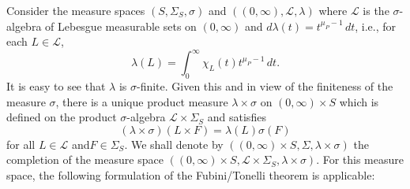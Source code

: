 \documentclass[11pt]{article}
\theoremstyle{theorem}
\begin{document}
 Consider the measure spaces $(S,\Sigma_S,\sigma)$ and $((0,\infty),\mathcal{L},\lambda)$ where $\mathcal{L}$ is the $\sigma$-algebra of Lebesgue measurable sets on $(0,\infty)$ and $d\lambda(t)=t^{\mu_P-1}\,dt$, i.e., for each $L\in\mathcal{L}$,
\begin{equation*}
\lambda(L)=\int_0^\infty \chi_{L}(t)t^{\mu_P-1}\,dt.
\end{equation*}
It is easy to see that $\lambda$ is $\sigma$-finite. Given this and in view of the finiteness of the measure $\sigma$, there is a unique product measure $\lambda\times\sigma$ on $(0,\infty)\times S$ which is defined on the product $\sigma$-algebra $\mathcal{L}\times\Sigma_S$ and satisfies
\begin{equation*}
(\lambda\times\sigma)(L\times F)=\lambda(L)\sigma(F)
\end{equation*}
for all $L\in\mathcal{L}$ and$F\in \Sigma_S$. We shall denote by $((0,\infty)\times S,\Sigma,\lambda\times\sigma)$ the completion of the measure space $((0,\infty)\times S,\mathcal{L}\times\Sigma_S,\lambda\times\sigma)$. For this measure space, the following formulation of the Fubini/Tonelli theorem is applicable:
\end{document}
